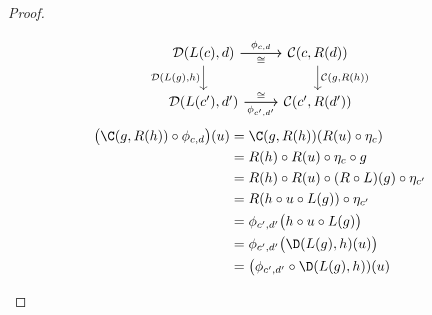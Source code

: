 \begin{theorem}
\begin{proof}
\begin{description}
        \[\begin{tikzcd}[ampersand replacement=\&]
          {\mathcal{D}(L(c), d)} \& {\mathcal{C}(c, R(d))} \\
          {\mathcal{D}(L(c'), d')} \& {\mathcal{C}(c', R(d'))}
          \arrow["{\phi_{c,d}}", from=1-1, to=1-2]
          \arrow["{\mathcal{D}(L(g),h)}"', from=1-1, to=2-1]
          \arrow["{\phi_{c',d'}}"', from=2-1, to=2-2]
          \arrow["{\mathcal{C}(g,R(h))}", from=1-2, to=2-2]
          \arrow["\cong"', from=1-1, to=1-2]
          \arrow["\cong", from=2-1, to=2-2]
        \end{tikzcd}\]
        \[
          \begin{aligned}
            \big(\C(g, R(h))\circ \phi_{c,d}\big)(u)
            &= \C(g, R(h))(R(u)\circ\eta_c)\\
            &= R(h)\circ R(u)\circ\eta_c \circ g\\
            &= R(h)\circ R(u) \circ (R\circ L)(g)\circ \eta_{c'}\\
            &= R(h\circ u\circ L(g))\circ \eta_{c'}\\
            &= \phi_{c', d'}\big(h\circ u \circ L(g)\big)\\
            &= \phi_{c', d'}\big(\D(L(g), h)(u)\big)\\
            &= \big(\phi_{c', d'}\circ \D(L(g), h))(u)
          \end{aligned}
        \]
    \end{description}
  \end{proof}
\end{theorem}